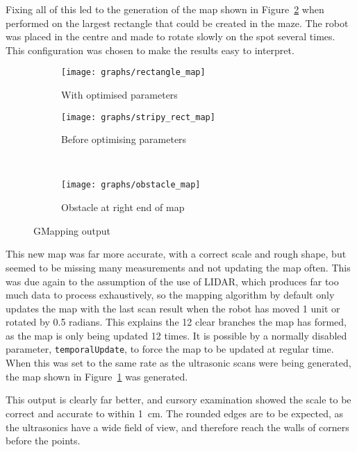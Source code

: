 Fixing all of this led to the generation of the map shown in Figure~\ref{fig:gmapping_output/stripy} when performed
on the largest rectangle that could be created in the maze. The robot was placed in the centre and made to rotate
slowly on the spot several times. This configuration was chosen to make the results easy to interpret.

\begin{figure}[!ht]
\centering
	\begin{subfigure}[b]{0.5\textwidth}
		\texttt{[image: graphs/rectangle\_map]}
		\caption{With optimised parameters}
		\label{fig:gmapping_output/rect}
	\end{subfigure}

  \centering
  \begin{subfigure}[b]{0.4\textwidth}
    \texttt{[image: graphs/stripy\_rect\_map]}
    \caption{Before optimising parameters}
    \label{fig:gmapping_output/stripy}
  \end{subfigure}
  ~
  \begin{subfigure}[b]{0.4\textwidth}
    \texttt{[image: graphs/obstacle\_map]}
    \caption{Obstacle at right end of map}
    \label{fig:gmapping_output/obstacle}
  \end{subfigure}
  \caption{GMapping output}\label{fig:gmapping_output}
\end{figure}

This new map was far more accurate, with a correct scale and rough shape, but seemed to be missing many measurements
and not updating the map often. This was due again to the assumption of the use of LIDAR, which produces far too
much data to process exhaustively, so the mapping algorithm by default only updates the map with the last scan result
when the robot has moved 1 unit or rotated by 0.5 radians. This explains the 12 clear branches the map has formed,
as the map is only being updated 12 times. It is possible by a normally disabled parameter, \verb|temporalUpdate|,
to force the map to be updated at regular time. When this was set to the same rate as the ultrasonic scans were
being generated, the map shown in Figure~\ref{fig:gmapping_output/rect} was generated.

This output is clearly far better, and cursory examination showed the scale to be correct and accurate to within
\SI{1}{cm}. The rounded edges are to be expected, as the ultrasonics have a wide field of view, and therefore
reach the walls of corners before the points.

